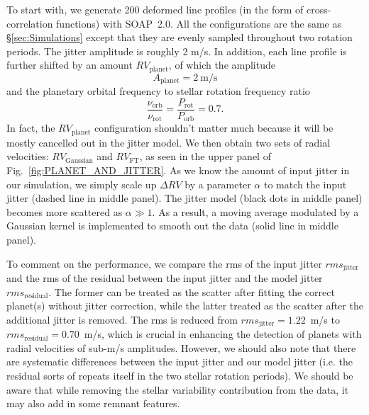 To start with, we generate 200 deformed line profiles (in the form of cross-correlation functions) with SOAP~2.0.
All the configurations are the same as \S\ref{sec:Simulations} except that they are evenly sampled throughout two
rotation periods. The jitter amplitude is roughly 2 m/s. 
In addition, each line profile is further shifted by an amount $RV_\text{planet}$, of which the amplitude
\begin{equation*}
	A_\text{planet} = 2~\text{m/s}
\end{equation*}
and the planetary orbital frequency to stellar rotation frequency ratio
\begin{equation*}
	\frac{\nu_\text{orb}}{\nu_\text{rot}} = \frac{P_\text{rot}}{P_\text{orb}} = 0.7.
\end{equation*}
In fact, the $RV_\text{planet}$ configuration shouldn't matter much 
because it will be mostly cancelled out in the jitter model. We then obtain two sets of radial velocities: 
$RV_\text{Gaussian}$ and $RV_\text{FT}$, as seen in the upper panel of Fig.~\ref{fig:PLANET_AND_JITTER}. 
As we know the amount of input jitter in our simulation, we simply scale up $\Delta RV$ by a parameter $\alpha$
to match the input jitter (dashed line in middle panel). 
The jitter model (black dots in middle panel) becomes more scattered as $\alpha \gg 1$.  
As a result, a moving average modulated by a Gaussian kernel is implemented to smooth out the data (solid line 
in middle panel).

To comment on the performance, we compare the rms of the input jitter $rms_\text{jitter}$
and the rms of the residual between the input jitter and the model jitter $rms_\text{residual}$. 
The former can be treated as the scatter after fitting the correct planet(s) without jitter correction, 
while the latter treated as the scatter after the additional jitter is removed.
The rms is reduced from $rms_\text{jitter} = 1.22$~m/s to $rms_\text{residual} = 0.70$~m/s,
which is crucial in enhancing the detection of planets with radial velocities of sub-m/s amplitudes. 
However, we should also note that there are systematic differences between the input jitter and our model jitter
(i.e. the residual sorts of repeats itself in the two stellar rotation periods). We should be aware that 
while removing the stellar variability contribution from the data, it may also add in some remnant features. 

